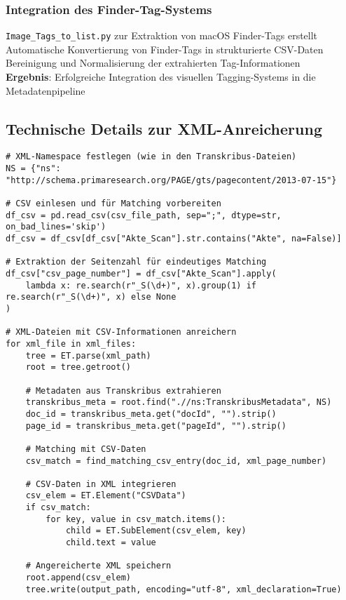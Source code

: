 \documentclass{article}
\begin{document}
\subsubsection*{\small Integration des Finder-Tag-Systems}
 \texttt{Image\_Tags\_to\_list.py} zur Extraktion von macOS Finder-Tags erstellt\\
 Automatische Konvertierung von Finder-Tags in strukturierte CSV-Daten\\
 Bereinigung und Normalisierung der extrahierten Tag-Informationen\\
\textbf{Ergebnis}: Erfolgreiche Integration des visuellen Tagging-Systems in die Metadatenpipeline

\subsection*{Technische Details zur XML-Anreicherung}
\begin{verbatim}
# XML-Namespace festlegen (wie in den Transkribus-Dateien)
NS = {"ns": "http://schema.primaresearch.org/PAGE/gts/pagecontent/2013-07-15"}

# CSV einlesen und für Matching vorbereiten
df_csv = pd.read_csv(csv_file_path, sep=";", dtype=str, on_bad_lines='skip')
df_csv = df_csv[df_csv["Akte_Scan"].str.contains("Akte", na=False)]

# Extraktion der Seitenzahl für eindeutiges Matching
df_csv["csv_page_number"] = df_csv["Akte_Scan"].apply(
    lambda x: re.search(r"_S(\d+)", x).group(1) if re.search(r"_S(\d+)", x) else None
)

# XML-Dateien mit CSV-Informationen anreichern
for xml_file in xml_files:
    tree = ET.parse(xml_path)
    root = tree.getroot()
    
    # Metadaten aus Transkribus extrahieren
    transkribus_meta = root.find(".//ns:TranskribusMetadata", NS)
    doc_id = transkribus_meta.get("docId", "").strip()
    page_id = transkribus_meta.get("pageId", "").strip()
    
    # Matching mit CSV-Daten
    csv_match = find_matching_csv_entry(doc_id, xml_page_number)
    
    # CSV-Daten in XML integrieren
    csv_elem = ET.Element("CSVData")
    if csv_match:
        for key, value in csv_match.items():
            child = ET.SubElement(csv_elem, key)
            child.text = value
    
    # Angereicherte XML speichern
    root.append(csv_elem)
    tree.write(output_path, encoding="utf-8", xml_declaration=True)
\end{verbatim}
\end{document}
